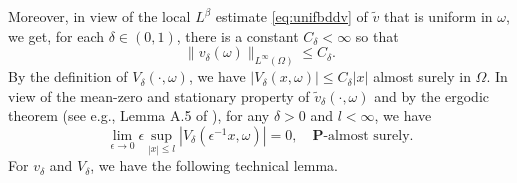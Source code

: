 \documentclass[11pt,reqno]{amsart}
\theoremstyle{definition}
\theoremstyle{remark}
\numberwithin{equation}{section}
\begin{document}
Moreover, in view of the local $L^\beta$ estimate \eqref{eq:unifbddv} of $\widetilde{v}$ that is uniform in $\omega$, we get, for each $\delta \in (0,1)$, there is a constant $C_\delta<\infty$ so that
\begin{equation}
    \label{eq:vhatbdd}
    \|v_\delta(\omega)\|_{L^\infty(\Omega)} \le C_\delta.
\end{equation}
By the definition of $V_\delta(\cdot,\omega)$, we have $|V_\delta(x,\omega)| \le C_\delta|x|$ almost surely in $\Omega$. In view of the mean-zero and stationary property of $\widetilde v_\delta(\cdot,\omega)$ and by the ergodic theorem (see e.g., Lemma A.5 of \cite{MR2914944}), 
for any $\delta >0$ and $l < \infty$, we have
\begin{equation}\label{ergoV}
    \lim_{\epsilon \to 0} \epsilon \sup_{|x|\leq l}|V_{\delta}(\epsilon^{-1}x,\omega)| = %
    0, \quad \mathbf{P}\text{-almost surely}.
\end{equation}
For $v_{\delta}$ and $V_{\delta}$, we have the following technical lemma.
\end{document}
